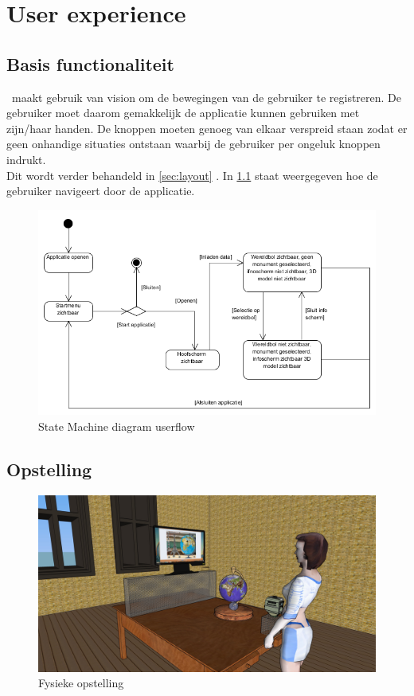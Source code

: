 \chapter{User experience} \label{cha:userexperience}

\section{Basis functionaliteit} \label{sec:basis}
\projectname\ maakt gebruik van vision om de bewegingen van de gebruiker te registreren. De gebruiker moet daarom gemakkelijk de applicatie kunnen gebruiken met zijn/haar handen. De knoppen moeten genoeg van elkaar verspreid staan zodat er geen onhandige situaties ontstaan waarbij de gebruiker per ongeluk knoppen indrukt.\\
Dit wordt verder behandeld in \cref{sec:layout} . In \cref{fig:statemachine1} staat weergegeven hoe de gebruiker navigeert door de applicatie.

\begin{figure}[h]
	\includegraphics[width=130mm]{figs/state_machine1.png}
	\caption{State Machine diagram userflow}
	\label{fig:statemachine1}
\end{figure}


\newpage
\section{Opstelling} \label{sec:setup}
\begin{figure}[h]
	\includegraphics[width=130mm]{figs/screen1.jpg}
	\caption{Fysieke opstelling}
	\label{fig:screen1}
\end{figure}

